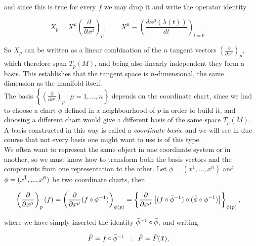         and since this is true for every $f$ we may drop it and write the operator identity

        \begin{equation}\label{eq:VectorInBasis}
            X_p = X^{\mu}\left(\frac{\partial}{\partial x^{\mu}}\right)_p, \qquad X^{\mu} \equiv \left(\frac{dx^{\mu}(\lambda(t))}{dt}\right)_{t=0}.
        \end{equation}

        So $X_p$ can be written as a linear combination of the $n$ tangent vectors $\left(\frac{\partial}{\partial x^{\mu}}\right)_p$, which therefore span $T_p(M)$, and being also linearly independent they form a basis. This establishes that the tangent space is $n$-dimensional, the same dimension as the manifold itself.\\

        The basis $\left\{\left(\frac{\partial}{\partial x^{\mu}}\right)_p\;: \mu = 1,...,n\right\}$ depends on the coordinate chart, since we had to choose a chart $\phi$ defined in a neighbourhood of $p$ in order to build it, and choosing a different chart would give a different basis of the same space $T_p(M)$. A basis constructed in this way is called a \textit{coordinate basis}, and we will see in due course that not every basis one might want to use is of this type.\\

        We often want to represent the same object in one coordinate system or in another, so we must know how to transform both the basis vectors and the components from one representation to the other. Let $\phi = (x^1,...,x^n)$ and $\Bar{\phi}=(x^{\Bar{1}},...,x^{\Bar{n}})$ be two coordinate charts, then

        \begin{equation}
            \left(\frac{\partial}{\partial x^{\mu}}\right)_p(f) = \left(\frac{\partial}{\partial x^{\mu}}(f \circ \phi^{-1})\right)_{\phi(p)} = \left\{\frac{\partial}{\partial x^{\mu}}\left[(f\circ \Bar{\phi}^{-1})\circ(\Bar{\phi}\circ \phi^{-1})\right]\right\}_{\phi(p)},
        \end{equation}

        where we have simply inserted the identity $\Bar{\phi}^{-1}\circ\Bar{\phi}$, and writing

        \begin{equation}
            \Bar{F} = f \circ \Bar{\phi}^{-1}\;\;:\;\; \Bar{F} = \Bar{F}(\Bar{x}),
        \end{equation}

